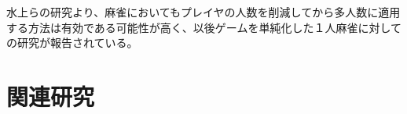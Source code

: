 水上らの研究より、麻雀においてもプレイヤの人数を削減してから多人数に適用する方法は有効である可能性が高く、以後ゲームを単純化した１人麻雀に対しての研究が報告されている。






\section{関連研究}
